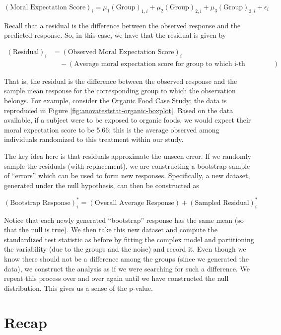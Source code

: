 \documentclass[]{book}
\theoremstyle{plain}
\theoremstyle{mydefn}
\theoremstyle{myexmpl}
\theoremstyle{remark}
\begin{document}
\[(\text{Moral Expectation Score})_i = \mu_1 (\text{Group})_{1,i} + \mu_2 (\text{Group})_{2,i} + \mu_3 (\text{Group})_{3,i} + \epsilon_i\]

Recall that a residual is the difference between the observed response
and the predicted response. So, in this case, we have that the residual
is given by

\[
\begin{aligned}
 (\text{Residual})_i &= (\text{Observed Moral Expectation Score})_i \\
  & \quad - (\text{Average moral expectation score for group to which i-th observation belongs})
\end{aligned}\]

That is, the residual is the difference between the observed response
and the sample mean response for the corresponding group to which the
observation belongs. For example, consider the
\protect\hyperlink{CaseOrganic}{Organic Food Case Study}; the data is
reproduced in Figure \ref{fig:anovateststat-organic-boxplot}. Based on
the data available, if a subject were to be exposed to organic foods, we
would expect their moral expectation score to be 5.66; this is the
average observed among individuals randomized to this treatment within
our study.

The key idea here is that residuals approximate the unseen error. If we
randomly sample the residuals (with replacement), we are constructing a
bootstrap sample of ``errors'' which can be used to form new responses.
Specifically, a new dataset, generated under the null hypothesis, can
then be constructed as

\[
(\text{Bootstrap Response})_i^* = (\text{Overall Average Response}) + (\text{Sampled Residual})_i^*
\]

Notice that each newly generated ``bootstrap'' response has the same
mean (so that the null is true). We then take this new dataset and
compute the standardized test statistic as before by fitting the complex
model and partitioning the variability (due to the groups and the noise)
and record it. Even though we know there should not be a difference
among the groups (since we generated the data), we construct the
analysis as if we were searching for such a difference. We repeat this
process over and over again until we have constructed the null
distribution. This gives us a sense of the p-value.

\section{Recap}\label{recap-2}
\end{document}
